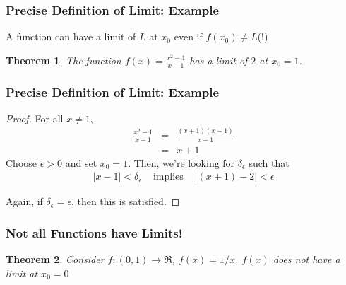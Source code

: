 \documentclass{beamer}
\newtheorem{thm}{Theorem}
\numberwithin{equation}{section}
\begin{document}
\begin{frame}
\frametitle{Precise Definition of Limit: Example}

A function can have a limit of $L$ at $x_{0}$ even if $f(x_{0} ) \neq L$(!)

\begin{thm} The function $f(x) = \frac{x^2 - 1}{x - 1} $ has a limit of $2$ at $x_{0} = 1$.  
\end{thm}

\begin{center}
\end{center}

\end{frame}


\begin{frame}
\frametitle{Precise Definition of Limit: Example}

\begin{proof}
For all $x \neq 1$, 
\begin{eqnarray}
\frac{x^2 - 1}{x - 1} & = & \frac{(x + 1)(x - 1) }{x - 1}  \nonumber \\					
								& = & x + 1 \nonumber 
\end{eqnarray}
Choose $\epsilon >0$ and set $x_{0}=1$.  Then, we're looking for $\delta_{\epsilon}$ such that 
\begin{eqnarray}
|x - 1|< \delta_{\epsilon} & \text{ implies } & |(x + 1) - 2| < \epsilon \nonumber 
\end{eqnarray}

Again, if $\delta_{\epsilon} = \epsilon$, then this is satisfied.  

							
\end{proof}


\end{frame}

\begin{frame}
\frametitle{Not all Functions have Limits!}

\begin{thm} Consider $f:(0,1) \rightarrow \Re$, $f(x) = 1/x$.  $f(x)$ does not have a limit at $x_{0}=0$ 
\end{thm}





\end{frame}
\end{document}
